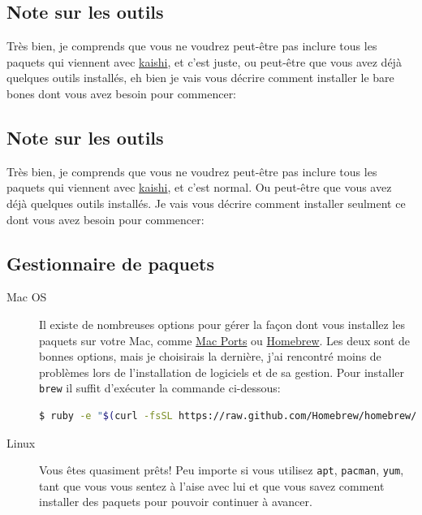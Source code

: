\documentclass[]{report}
\begin{document}
    \subsection{Note sur les outils}

      Très bien, je comprends que vous ne voudrez peut-être pas inclure tous les paquets qui viennent avec \href{http://icalialabs.github.io/kaishi/}{kaishi}, et c'est juste, ou peut-être que vous avez déjà quelques outils installés, eh bien je vais vous décrire comment installer le bare bones dont vous avez besoin pour commencer:

    \subsection{Note sur les outils}

      Très bien, je comprends que vous ne voudrez peut-être pas inclure tous les paquets qui viennent avec \href{http://icalialabs.github.io/kaishi/}{kaishi}, et c'est normal. Ou peut-être que vous avez déjà quelques outils installés. Je vais vous décrire comment installer seulment ce dont vous avez besoin pour commencer:

    \subsection{Gestionnaire de paquets}

      \begin{description}
        \item[Mac OS] Il existe de nombreuses options pour gérer la façon dont vous installez les paquets sur votre Mac, comme \href{https://www.macports.org/}{Mac Ports} ou \href{http://brew.sh/}{Homebrew}. Les deux sont de bonnes options, mais je choisirais la dernière, j'ai rencontré moins de problèmes lors de l'installation de logiciels et de sa gestion. Pour installer \verb|brew| il suffit d'exécuter la commande ci-dessous:
        \begin{scriptsize}
        \begin{lstlisting}[language=bash]
        $ ruby -e "$(curl -fsSL https://raw.github.com/Homebrew/homebrew/go/install)"
        \end{lstlisting}
        \end{scriptsize}
        \item[Linux] Vous êtes quasiment prêts! Peu importe si vous utilisez \verb|apt|, \verb|pacman|, \verb|yum|, tant que vous vous sentez à l'aise avec lui et que vous savez comment installer des paquets pour pouvoir continuer à avancer.
      \end{description}
\end{document}
